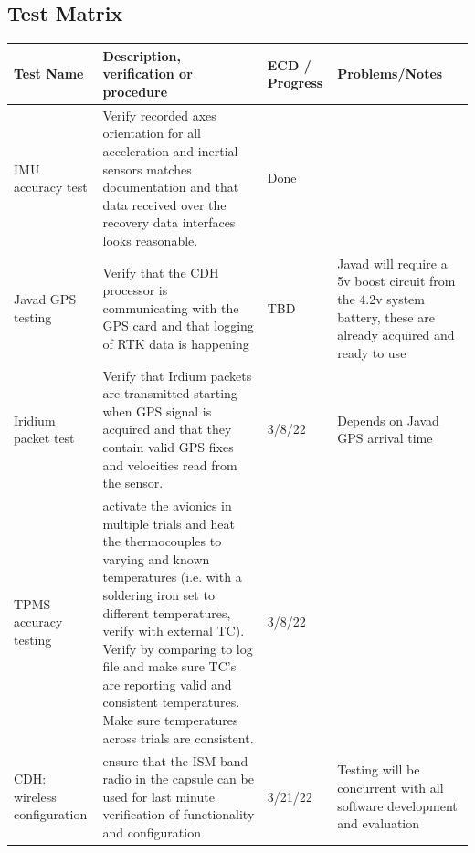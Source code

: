 \documentclass{article}
\begin{document}
\begin{landscape}
\section{Test Matrix}
\label{appendix-testing}
\begin{table}[!bp]
	\centering
			\def\arraystretch{1.75}
			\small\centering
			\setlength{\tabcolsep}{1.0mm}
			\scriptsize
			\centering
			\caption{Test matrix for avionics integration verifications}
			\label{my-label}  
			
			\begin{table}[H]
				\scriptsize
				\begin{tabular}{p{3cm} | p{13cm}  L p{5cm}}
					\textbf{Test Name} &\textbf{ Description, verification or procedure}& \textbf{ ECD / Progress} & \textbf{Problems/Notes} \\
					\hline
					IMU accuracy test &  Verify recorded axes orientation for all acceleration and inertial sensors matches documentation and that data received over the recovery data interfaces looks reasonable. &  Done &  \\
					
					Javad GPS testing & Verify that the CDH processor is communicating with the GPS card and that logging of RTK data is happening & TBD & Javad will require a 5v boost circuit from the 4.2v system battery, these are already acquired and ready to use \\
					
					Iridium packet test & Verify that Irdium packets are transmitted starting when GPS signal is acquired and that they contain valid GPS fixes and velocities read from the sensor. & 3/8/22 & Depends on Javad GPS arrival time \\
					
					TPMS accuracy testing & activate the avionics in multiple trials and heat the thermocouples to varying and known temperatures (i.e. with a soldering iron set to different temperatures, verify with external TC). Verify by comparing to log file and make sure TC's are reporting valid and consistent temperatures. Make sure temperatures across trials are consistent. & 3/8/22 & \\
					
					CDH: wireless configuration & ensure that the ISM band radio in the capsule can be used for last minute verification of functionality and configuration & 3/21/22 & Testing will be concurrent with all software development and evaluation \\
					

\end{tabular}
\end{table}
\end{table}
\end{landscape}
\end{document}
